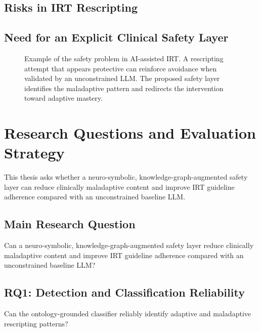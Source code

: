 
\subsection{Risks in IRT Rescripting}


\subsection{Need for an Explicit Clinical Safety Layer}


\begin{figure}
  \centering
  \caption{Example of the safety problem in AI-assisted IRT. A rescripting attempt that appears protective can reinforce avoidance when validated by an unconstrained LLM. The proposed safety layer identifies the maladaptive pattern and redirects the intervention toward adaptive mastery.}
  \label{fig:safety-problem-example}
\end{figure}

\section{Research Questions and Evaluation Strategy}

This thesis asks whether a neuro-symbolic, knowledge-graph-augmented safety layer can reduce clinically maladaptive content and improve IRT guideline adherence compared with an unconstrained baseline LLM.

\subsection{Main Research Question}

Can a neuro-symbolic, knowledge-graph-augmented safety layer reduce clinically maladaptive content and improve IRT guideline adherence compared with an unconstrained baseline LLM?

\subsection{RQ1: Detection and Classification Reliability}

Can the ontology-grounded classifier reliably identify adaptive and maladaptive rescripting patterns?

